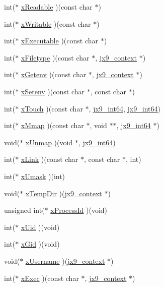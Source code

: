 \begin{DoxyCompactItemize}
\item 
int($\ast$ \hyperlink{structjx9__vfs_ad126634728b2e871f7428bd40148f0df}{x\-Readable} )(const char $\ast$)
\item 
int($\ast$ \hyperlink{structjx9__vfs_ad22c7965193ca4fd233887d0cd1d9bb8}{x\-Writable} )(const char $\ast$)
\item 
int($\ast$ \hyperlink{structjx9__vfs_ac76b0d21ad0d70271a5f874fe38e42c5}{x\-Executable} )(const char $\ast$)
\item 
int($\ast$ \hyperlink{structjx9__vfs_a60ffb0b1c8bb9107e584cc9f9e98af2a}{x\-Filetype} )(const char $\ast$, \hyperlink{structjx9__context}{jx9\-\_\-context} $\ast$)
\item 
int($\ast$ \hyperlink{structjx9__vfs_a72dc5b08732765d1140fe3d44789893c}{x\-Getenv} )(const char $\ast$, \hyperlink{structjx9__context}{jx9\-\_\-context} $\ast$)
\item 
int($\ast$ \hyperlink{structjx9__vfs_a7a4c400e13f121c6707c5251bd2ea08a}{x\-Setenv} )(const char $\ast$, const char $\ast$)
\item 
int($\ast$ \hyperlink{structjx9__vfs_a3c747a49be1736e8347d381fef69a920}{x\-Touch} )(const char $\ast$, \hyperlink{unqlite_8c_aeaac5ecf324354b1c4bb9f6559bab7af}{jx9\-\_\-int64}, \hyperlink{unqlite_8c_aeaac5ecf324354b1c4bb9f6559bab7af}{jx9\-\_\-int64})
\item 
int($\ast$ \hyperlink{structjx9__vfs_a2a3d6d05901d6e18add5e20eec71a3fe}{x\-Mmap} )(const char $\ast$, void $\ast$$\ast$, \hyperlink{unqlite_8c_aeaac5ecf324354b1c4bb9f6559bab7af}{jx9\-\_\-int64} $\ast$)
\item 
void($\ast$ \hyperlink{structjx9__vfs_add213ec7c13586407a3cb48332fb11dd}{x\-Unmap} )(void $\ast$, \hyperlink{unqlite_8c_aeaac5ecf324354b1c4bb9f6559bab7af}{jx9\-\_\-int64})
\item 
int($\ast$ \hyperlink{structjx9__vfs_af127a9d111fbd5fe53267acef8797db4}{x\-Link} )(const char $\ast$, const char $\ast$, int)
\item 
int($\ast$ \hyperlink{structjx9__vfs_acfb2d8db57d6f4b3c9799b03ce93e510}{x\-Umask} )(int)
\item 
void($\ast$ \hyperlink{structjx9__vfs_a1b4af9f1186fe361ca3c84474a236c08}{x\-Temp\-Dir} )(\hyperlink{structjx9__context}{jx9\-\_\-context} $\ast$)
\item 
unsigned int($\ast$ \hyperlink{structjx9__vfs_a0a08953436ce2a9776cc7a8a671093dc}{x\-Process\-Id} )(void)
\item 
int($\ast$ \hyperlink{structjx9__vfs_ab9efc62e64316ba92a365dce7329dc1b}{x\-Uid} )(void)
\item 
int($\ast$ \hyperlink{structjx9__vfs_ac6efe0c20c468678c20efdb38010d47f}{x\-Gid} )(void)
\item 
void($\ast$ \hyperlink{structjx9__vfs_ae7f3d554677765db1437f6a6526c63ca}{x\-Username} )(\hyperlink{structjx9__context}{jx9\-\_\-context} $\ast$)
\item 
int($\ast$ \hyperlink{structjx9__vfs_a3663a318c705c452c1c5f9ae4165a822}{x\-Exec} )(const char $\ast$, \hyperlink{structjx9__context}{jx9\-\_\-context} $\ast$)
\end{DoxyCompactItemize}


